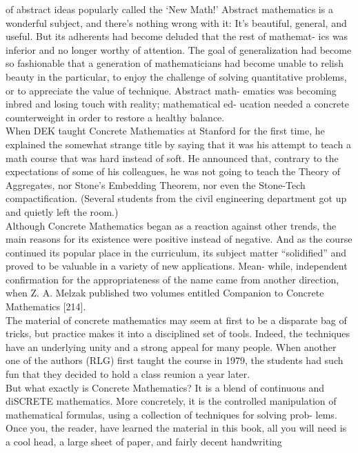 \documentclass[a4paper]{article}
\begin{document}
of abstract ideas popularly called the `New Math!' Abstract mathematics is a
wonderful subject, and there's nothing wrong with it: It's beautiful, general,
and useful. But its adherents had become deluded that the rest of mathemat-
ics was inferior and no longer worthy of attention. The goal of generalization
had become so fashionable that a generation of mathematicians had become
unable to relish beauty in the particular, to enjoy the challenge of solving
 quantitative problems, or to appreciate the value of technique. Abstract math-
ematics was becoming inbred and losing touch with reality; mathematical ed-
ucation needed a concrete counterweight in order to restore a healthy balance. \\
\indent When DEK taught Concrete Mathematics at Stanford for the first time,
 he explained the somewhat strange title by saying that it was his attempt to teach a math course that was hard instead of soft. He announced that,
contrary to the expectations of some of his colleagues, he was not going to
teach the Theory of Aggregates, nor Stone's Embedding Theorem, nor even
the Stone-Tech compactification. (Several students from the civil engineering
department got up and quietly left the room.) \\
Although Concrete Mathematics began as a reaction against other trends,
the main reasons for its existence were positive instead of negative. And as
the course continued its popular place in the curriculum, its subject matter
``solidified'' and proved to be valuable in a variety of new applications. Mean-
while, independent confirmation for the appropriateness of the name came
from another direction, when Z. A. Melzak published two volumes entitled
Companion to Concrete Mathematics [214]. \\
\indent The material of concrete mathematics may seem at first to be a disparate
bag of tricks, but practice makes it into a disciplined set of tools. Indeed, the
techniques have an underlying unity and a strong appeal for many people.
When another one of the authors (RLG) first taught the course in 1979, the
students had such fun that they decided to hold a class reunion a year later. \\
\indent But what exactly is Concrete Mathematics? It is a blend of continuous
and diSCRETE mathematics. More concretely, it is the controlled manipulation
of mathematical formulas, using a collection of techniques for solving prob-
lems. Once you, the reader, have learned the material in this book, all you
will need is a cool head, a large sheet of paper, and fairly decent handwriting
\end{document}
